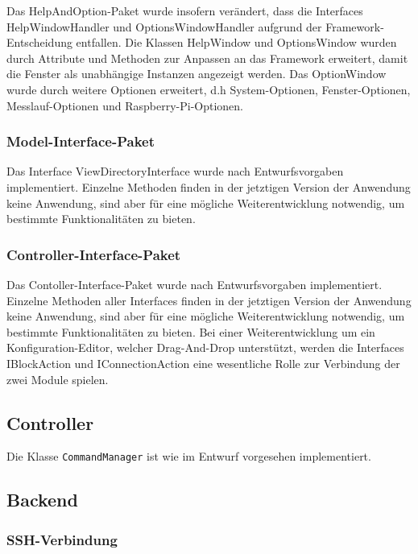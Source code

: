 \documentclass[parskip=full]{scrartcl}
\begin{document}
Das HelpAndOption-Paket wurde insofern verändert, dass die Interfaces HelpWindowHandler und OptionsWindowHandler aufgrund der Framework-Entscheidung entfallen.
Die Klassen HelpWindow und OptionsWindow wurden durch Attribute und Methoden zur Anpassen an das Framework erweitert, damit die Fenster als unabhängige Instanzen angezeigt werden. Das OptionWindow wurde durch weitere Optionen erweitert, d.h System-Optionen, Fenster-Optionen, Messlauf-Optionen und Raspberry-Pi-Optionen.

\subsubsection{Model-Interface-Paket}

Das Interface ViewDirectoryInterface wurde nach Entwurfsvorgaben implementiert. Einzelne Methoden finden in der jetztigen Version der Anwendung keine Anwendung, sind aber für eine mögliche Weiterentwicklung notwendig, um bestimmte Funktionalitäten zu bieten.

\subsubsection{Controller-Interface-Paket}

Das Contoller-Interface-Paket wurde nach Entwurfsvorgaben implementiert. Einzelne Methoden aller Interfaces finden in der jetztigen Version der Anwendung keine Anwendung, sind aber für eine mögliche Weiterentwicklung notwendig, um bestimmte Funktionalitäten zu bieten. Bei einer Weiterentwicklung um ein Konfiguration-Editor, welcher Drag-And-Drop unterstützt, werden die Interfaces IBlockAction und IConnectionAction eine wesentliche Rolle zur Verbindung der zwei Module spielen.

\subsection{Controller}

Die Klasse \verb:CommandManager: ist wie im Entwurf vorgesehen implementiert.

\subsection{Backend}

\subsubsection{SSH-Verbindung}
\end{document}
